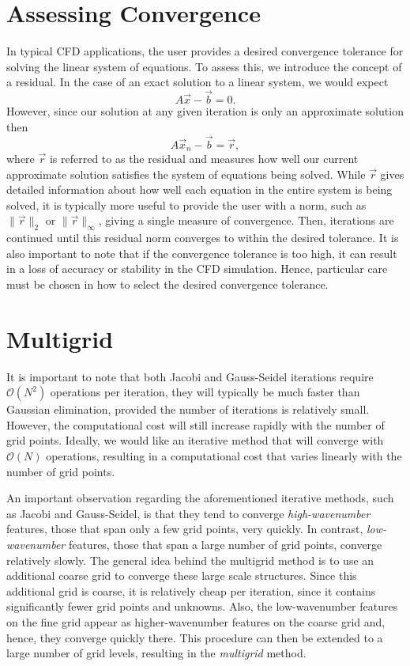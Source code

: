\section{Assessing Convergence}
In typical CFD applications, the user provides a desired convergence tolerance for solving the linear system of equations. To assess this, we introduce the concept of a residual. In the case of an exact solution to a linear system, we would expect
\begin{equation}
	A \vec{x} - \vec{b} = 0.
\end{equation}
However, since our solution at any given iteration is only an approximate solution then
\begin{equation}
	A \vec{x}_n - \vec{b} = \vec{r},
\end{equation}
where $\vec{r}$ is referred to as the residual and measures how well our current approximate solution satisfies the system of equations being solved. While $\vec{r}$ gives detailed information about how well each equation in the entire system is being solved, it is typically more useful to provide the user with a norm, such as $\| \vec{r} \|_2$ or $\| \vec{r} \|_\infty$, giving a single measure of convergence. Then, iterations are continued until this residual norm converges to within the desired tolerance. It is also important to note that if the convergence tolerance is too high, it can result in a loss of accuracy or stability in the CFD simulation. Hence, particular care must be chosen in how to select the desired convergence tolerance.

\section{Multigrid}
It is important to note that both Jacobi and Gauss-Seidel iterations require $\mathcal{O}(N^2)$ operations per iteration, they will typically be much faster than Gaussian elimination, provided the number of iterations is relatively small. However, the computational cost will still increase rapidly with the number of grid points. Ideally, we would like an iterative method that will converge with $\mathcal{O}(N)$ operations, resulting in a computational cost that varies linearly with the number of grid points.

An important observation regarding the aforementioned iterative methods, such as Jacobi and Gauss-Seidel, is that they tend to converge {\it high-wavenumber} features, those that span only a few grid points, very quickly. In contrast, {\it low-wavenumber} features, those that span a large number of grid points, converge relatively slowly. The general idea behind the multigrid method is to use an additional coarse grid to converge these large scale structures. Since this additional grid is coarse, it is relatively cheap per iteration, since it contains significantly fewer grid points and unknowns. Also, the low-wavenumber features on the fine grid appear as higher-wavenumber features on the coarse grid and, hence, they converge quickly there. This procedure can then be extended to a large number of grid levels, resulting in the {\it multigrid} method.

